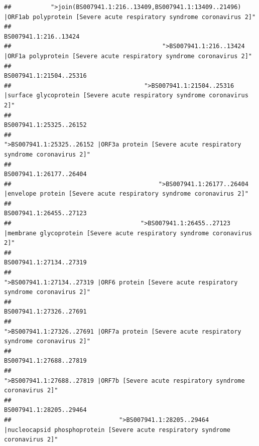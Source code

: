 \documentclass[
]{article}
\begin{document}
\begin{verbatim}
##           ">join(BS007941.1:216..13409,BS007941.1:13409..21496) |ORF1ab polyprotein [Severe acute respiratory syndrome coronavirus 2]" 
##                                                                                                                  BS007941.1:216..13424 
##                                          ">BS007941.1:216..13424 |ORF1a polyprotein [Severe acute respiratory syndrome coronavirus 2]" 
##                                                                                                                BS007941.1:21504..25316 
##                                     ">BS007941.1:21504..25316 |surface glycoprotein [Severe acute respiratory syndrome coronavirus 2]" 
##                                                                                                                BS007941.1:25325..26152 
##                                            ">BS007941.1:25325..26152 |ORF3a protein [Severe acute respiratory syndrome coronavirus 2]" 
##                                                                                                                BS007941.1:26177..26404 
##                                         ">BS007941.1:26177..26404 |envelope protein [Severe acute respiratory syndrome coronavirus 2]" 
##                                                                                                                BS007941.1:26455..27123 
##                                    ">BS007941.1:26455..27123 |membrane glycoprotein [Severe acute respiratory syndrome coronavirus 2]" 
##                                                                                                                BS007941.1:27134..27319 
##                                             ">BS007941.1:27134..27319 |ORF6 protein [Severe acute respiratory syndrome coronavirus 2]" 
##                                                                                                                BS007941.1:27326..27691 
##                                            ">BS007941.1:27326..27691 |ORF7a protein [Severe acute respiratory syndrome coronavirus 2]" 
##                                                                                                                BS007941.1:27688..27819 
##                                                    ">BS007941.1:27688..27819 |ORF7b [Severe acute respiratory syndrome coronavirus 2]" 
##                                                                                                                BS007941.1:28205..29464 
##                              ">BS007941.1:28205..29464 |nucleocapsid phosphoprotein [Severe acute respiratory syndrome coronavirus 2]" 

\end{verbatim}
\end{document}
